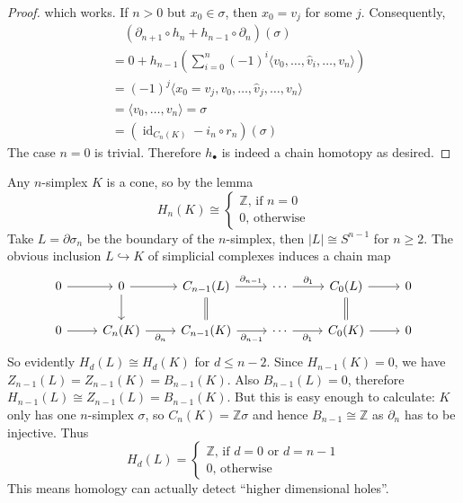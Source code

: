 \begin{proof}
    which works.
    If $n>0$ but $x_0\in\sigma$, then $x_0=v_j$ for some $j$.
    Consequently,
    \begin{align*}
        &\quad(\partial_{n+1}\circ h_n+h_{n-1}\circ\partial_n)(\sigma)\\
        &=0+h_{n-1}\left( \sum_{i=0}^n(-1)^i\langle v_0,\ldots,\hat{v}_i,\ldots,v_n \rangle\right)\\
        &=(-1)^j\langle x_0=v_j,v_0,\ldots,\hat{v}_j,\ldots,v_n\rangle\\
        &=\langle v_0,\ldots,v_n\rangle=\sigma\\
        &=(\operatorname{id}_{C_n(K)}-i_n\circ r_n)(\sigma)
    \end{align*}
    The case $n=0$ is trivial.
    Therefore $h_\bullet$ is indeed a chain homotopy as desired.
\end{proof}
\begin{example}
    Any $n$-simplex $K$ is a cone, so by the lemma
    $$H_n(K)\cong\begin{cases}
        \mathbb Z\text{, if $n=0$}\\
        0\text{, otherwise}
    \end{cases}$$
    Take $L=\partial\sigma_n$ be the boundary of the $n$-simplex, then $|L|\cong S^{n-1}$ for $n\ge 2$.
    The obvious inclusion $L\hookrightarrow K$ of simplicial complexes induces a chain map
    \[
        \begin{tikzcd}
            0\arrow{r}&0\arrow{r}\arrow{d}&C_{n-1}(L)\arrow{r}{\partial_{n-1}}\arrow[equal]{d}&\cdots\arrow{r}{\partial_1}&C_0(L)\arrow{r}\arrow[equal]{d}&0\\
            0\arrow{r}&C_n(K)\arrow[swap]{r}{\partial_n}&C_{n-1}(K)\arrow[swap]{r}{\partial_{n-1}}&\cdots\arrow[swap]{r}{\partial_1}&C_0(K)\arrow{r}&0
        \end{tikzcd}
    \]
    So evidently $H_d(L)\cong H_d(K)$ for $d\le n-2$.
    Since $H_{n-1}(K)=0$, we have $Z_{n-1}(L)=Z_{n-1}(K)=B_{n-1}(K)$.
    Also $B_{n-1}(L)=0$, therefore $H_{n-1}(L)\cong Z_{n-1}(L)=B_{n-1}(K)$.
    But this is easy enough to calculate:
    $K$ only has one $n$-simplex $\sigma$, so $C_n(K)=\mathbb Z\sigma$ and hence $B_{n-1}\cong\mathbb Z$ as $\partial_n$ has to be injective.
    Thus
    $$H_d(L)=\begin{cases}
        \mathbb Z\text{, if $d=0$ or $d=n-1$}\\
        0\text{, otherwise}
    \end{cases}$$
    This means homology can actually detect ``higher dimensional holes''.
\end{example}
